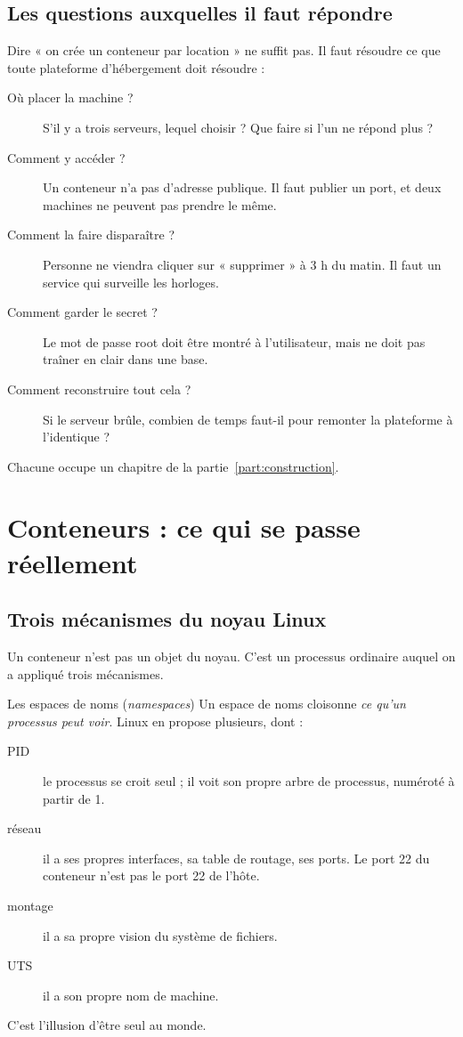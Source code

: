 \section{Les questions auxquelles il faut répondre}

Dire « on crée un conteneur par location » ne suffit pas. Il faut résoudre ce
que toute plateforme d'hébergement doit résoudre :

\begin{description}
\item[Où placer la machine ?] S'il y a trois serveurs, lequel choisir ? Que
  faire si l'un ne répond plus ?
\item[Comment y accéder ?] Un conteneur n'a pas d'adresse publique. Il faut
  publier un port, et deux machines ne peuvent pas prendre le même.
\item[Comment la faire disparaître ?] Personne ne viendra cliquer sur
  « supprimer » à 3 h du matin. Il faut un service qui surveille les horloges.
\item[Comment garder le secret ?] Le mot de passe root doit être montré à
  l'utilisateur, mais ne doit pas traîner en clair dans une base.
\item[Comment reconstruire tout cela ?] Si le serveur brûle, combien de temps
  faut-il pour remonter la plateforme à l'identique ?
\end{description}

Chacune occupe un chapitre de la partie~\ref{part:construction}.

\chapter{Conteneurs : ce qui se passe réellement}

\section{Trois mécanismes du noyau Linux}

Un conteneur n'est pas un objet du noyau. C'est un processus ordinaire auquel
on a appliqué trois mécanismes.

\begin{notion}{Les espaces de noms (\emph{namespaces})}
Un espace de noms cloisonne \emph{ce qu'un processus peut voir}. Linux en
propose plusieurs, dont :
\begin{description}
\item[PID] le processus se croit seul ; il voit son propre arbre de processus,
  numéroté à partir de 1.
\item[réseau] il a ses propres interfaces, sa table de routage, ses ports. Le
  port 22 du conteneur n'est pas le port 22 de l'hôte.
\item[montage] il a sa propre vision du système de fichiers.
\item[UTS] il a son propre nom de machine.
\end{description}
C'est l'illusion d'être seul au monde.
\end{notion}

